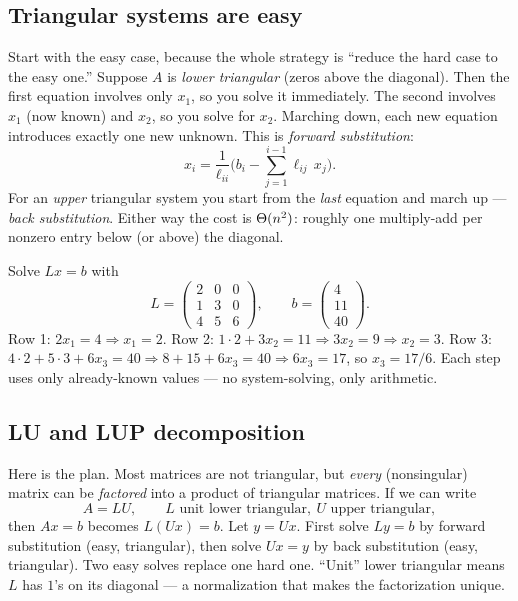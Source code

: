 \subsection{Triangular systems are easy}

Start with the easy case, because the whole strategy is ``reduce the hard case to
the easy one.'' Suppose $A$ is \emph{lower triangular} (zeros above the diagonal).
Then the first equation involves only $x_1$, so you solve it immediately. The
second involves $x_1$ (now known) and $x_2$, so you solve for $x_2$. Marching down,
each new equation introduces exactly one new unknown. This is \emph{forward
substitution}:
$$
x_i=\frac{1}{\ell_{ii}}\Big(b_i-\sum_{j=1}^{i-1}\ell_{ij}\,x_j\Big).
$$
For an \emph{upper} triangular system you start from the \emph{last} equation and
march up --- \emph{back substitution}. Either way the cost is $\Theta(n^2)$: roughly
one multiply-add per nonzero entry below (or above) the diagonal.

\begin{example}
\label{ch27:forward-sub}
Solve $Lx=b$ with
$$
L=\begin{pmatrix}2 & 0 & 0\\ 1 & 3 & 0\\ 4 & 5 & 6\end{pmatrix},\qquad
b=\begin{pmatrix}4\\ 11\\ 40\end{pmatrix}.
$$
Row 1: $2x_1=4\Rightarrow x_1=2$.
Row 2: $1\cdot 2+3x_2=11\Rightarrow 3x_2=9\Rightarrow x_2=3$.
Row 3: $4\cdot 2+5\cdot 3+6x_3=40\Rightarrow 8+15+6x_3=40\Rightarrow 6x_3=17$,
so $x_3=17/6$. Each step uses only already-known values --- no system-solving, only
arithmetic.
\end{example}

\subsection{LU and LUP decomposition}

Here is the plan. Most matrices are not triangular, but \emph{every} (nonsingular)
matrix can be \emph{factored} into a product of triangular matrices. If we can
write
$$
A=LU,\qquad L \text{ unit lower triangular},\ U \text{ upper triangular},
$$
then $Ax=b$ becomes $L(Ux)=b$. Let $y=Ux$. First solve $Ly=b$ by forward
substitution (easy, triangular), then solve $Ux=y$ by back substitution (easy,
triangular). Two easy solves replace one hard one. ``Unit'' lower triangular means
$L$ has $1$'s on its diagonal --- a normalization that makes the factorization
unique.

